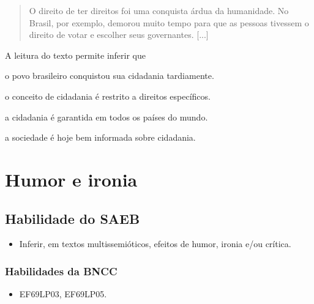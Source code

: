 \begin{quote}
O direito de ter direitos foi uma conquista árdua da humanidade. No
Brasil, por exemplo, demorou muito tempo para que as pessoas tivessem o
direito de votar e escolher seus governantes. {[}...{]}
\end{quote}


A leitura do texto permite inferir que

\begin{escolha}
\item o povo brasileiro conquistou sua cidadania tardiamente.

\item o conceito de cidadania é restrito a direitos específicos.

\item a cidadania é garantida em todos os países do mundo.

\item a sociedade é hoje bem informada sobre cidadania.
\end{escolha}

\chapter{Humor e ironia}

\section{Habilidade do SAEB}

\begin{itemize}
\item Inferir, em textos multissemióticos, efeitos de humor, ironia e/ou crítica.
\end{itemize}

\subsection{Habilidades da BNCC}

\begin{itemize}
\tightlist
\item
  EF69LP03, EF69LP05.
\end{itemize}

